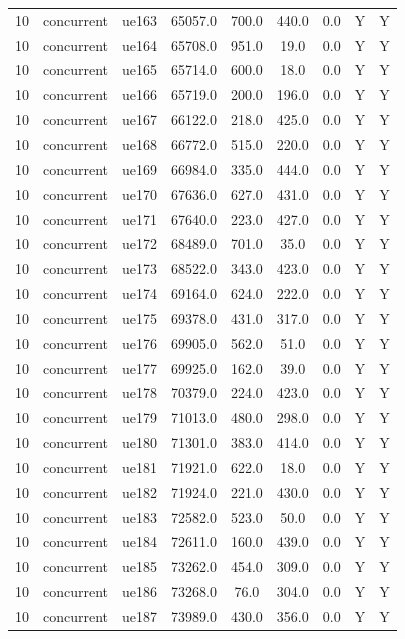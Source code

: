 \begin{table}[ht]
\begin{tabular}{|c|c|c|c|c|c|c|c|c|}
10 & concurrent & ue163 & 65057.0 & 700.0 & 440.0 & 0.0 & Y & Y \\
10 & concurrent & ue164 & 65708.0 & 951.0 & 19.0 & 0.0 & Y & Y \\
10 & concurrent & ue165 & 65714.0 & 600.0 & 18.0 & 0.0 & Y & Y \\
10 & concurrent & ue166 & 65719.0 & 200.0 & 196.0 & 0.0 & Y & Y \\
10 & concurrent & ue167 & 66122.0 & 218.0 & 425.0 & 0.0 & Y & Y \\
10 & concurrent & ue168 & 66772.0 & 515.0 & 220.0 & 0.0 & Y & Y \\
10 & concurrent & ue169 & 66984.0 & 335.0 & 444.0 & 0.0 & Y & Y \\
10 & concurrent & ue170 & 67636.0 & 627.0 & 431.0 & 0.0 & Y & Y \\
10 & concurrent & ue171 & 67640.0 & 223.0 & 427.0 & 0.0 & Y & Y \\
10 & concurrent & ue172 & 68489.0 & 701.0 & 35.0 & 0.0 & Y & Y \\
10 & concurrent & ue173 & 68522.0 & 343.0 & 423.0 & 0.0 & Y & Y \\
10 & concurrent & ue174 & 69164.0 & 624.0 & 222.0 & 0.0 & Y & Y \\
10 & concurrent & ue175 & 69378.0 & 431.0 & 317.0 & 0.0 & Y & Y \\
10 & concurrent & ue176 & 69905.0 & 562.0 & 51.0 & 0.0 & Y & Y \\
10 & concurrent & ue177 & 69925.0 & 162.0 & 39.0 & 0.0 & Y & Y \\
10 & concurrent & ue178 & 70379.0 & 224.0 & 423.0 & 0.0 & Y & Y \\
10 & concurrent & ue179 & 71013.0 & 480.0 & 298.0 & 0.0 & Y & Y \\
10 & concurrent & ue180 & 71301.0 & 383.0 & 414.0 & 0.0 & Y & Y \\
10 & concurrent & ue181 & 71921.0 & 622.0 & 18.0 & 0.0 & Y & Y \\
10 & concurrent & ue182 & 71924.0 & 221.0 & 430.0 & 0.0 & Y & Y \\
10 & concurrent & ue183 & 72582.0 & 523.0 & 50.0 & 0.0 & Y & Y \\
10 & concurrent & ue184 & 72611.0 & 160.0 & 439.0 & 0.0 & Y & Y \\
10 & concurrent & ue185 & 73262.0 & 454.0 & 309.0 & 0.0 & Y & Y \\
10 & concurrent & ue186 & 73268.0 & 76.0 & 304.0 & 0.0 & Y & Y \\
10 & concurrent & ue187 & 73989.0 & 430.0 & 356.0 & 0.0 & Y & Y \\

\end{tabular}
\end{table}
